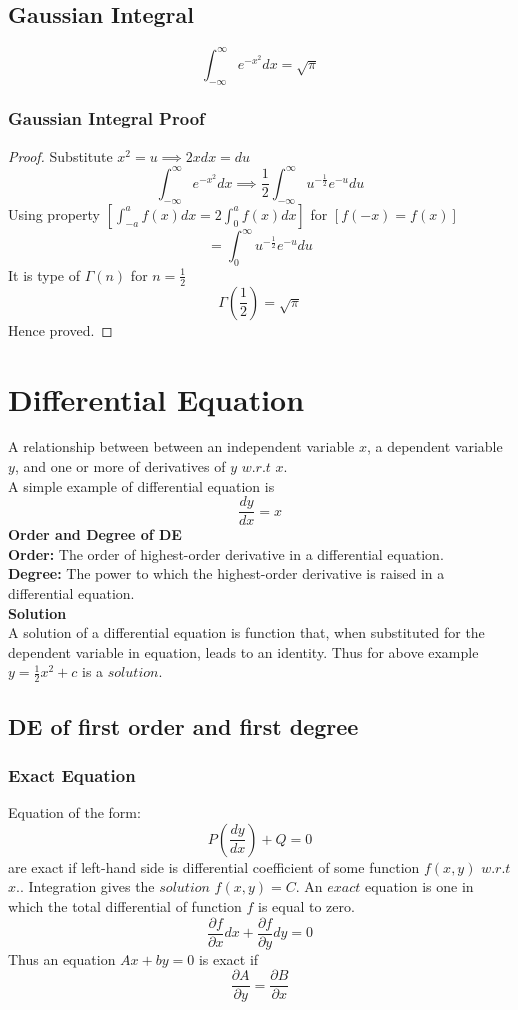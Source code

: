 \documentclass[twocolumn, 10pt]{article}
\begin{document}
\subsection{Gaussian Integral}
$$\int_{-\infty}^{\infty}e^{-x^{2}}dx=\sqrt{\pi}$$
\subsubsection{Gaussian Integral Proof}
\begin{proof}
Substitute $x^2=u \implies 2xdx=du$ \\
$$\int_{-\infty}^{\infty}e^{-x^{2}}dx \implies \frac{1}{2}\int_{-\infty}^{\infty} u^{-\frac{1}{2}}e^{-u}du$$
Using property $[\int_{-a}^{a}f(x)dx=2 \int_{0}^{a}f(x)dx]$ for $[f(-x)=f(x)]$ \\
$$=\int_{0}^{\infty} u^{-\frac{1}{2}}e^{-u}du$$
It is type of $\Gamma(n)$ for $n=\frac{1}{2}$
$$\Gamma(\frac{1}{2})=\sqrt{\pi}$$
Hence proved.
\end{proof}
\section{Differential Equation}
A relationship between between an independent variable $x$, a dependent variable $y$, and one or more of derivatives of $y$ $w.r.t$ $x$. \\
A simple example of differential equation is \\
$$\frac{dy}{dx}=x$$
\textbf{Order and Degree of DE}\\
\textbf{Order:} The order of highest-order derivative in a differential equation. \\
\textbf{Degree:} The power to which the highest-order derivative is raised in a differential equation.\\
\textbf{Solution}\\
A solution of a differential equation is function that, when substituted for the dependent variable in equation, leads to an identity. Thus for above example $y=\frac{1}{2}x^2+c$ is a $solution.$
\subsection{DE of first order and first degree}
\subsubsection{Exact Equation}
Equation of the form: $$P(\frac{dy}{dx})+	Q=0$$ are exact if left-hand side is differential coefficient of some function $f(x,y)$ $w.r.t$ $x.$. Integration gives the $solution$ $f(x,y)=C$. An $exact$ equation is one in which the total differential of function $f$ is equal to zero.
$$\frac{\partial f}{\partial x}dx+\frac{\partial f}{\partial y}dy=0$$
Thus an equation $Ax+by=0$ is exact if
$$\frac{\partial A}{\partial y}=\frac{\partial B}{\partial x}$$
\end{document}
